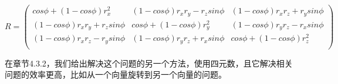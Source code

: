 \documentclass{ctexart}
\begin{document}
\begin{equation}
	\label{RotateArb4}
	R=\left(
		\begin{array}{ccc}
			cos\phi+(1-cos\phi)r_{x}^{2} & (1-cos\phi)r_{x}r_{y}-r_{z}sin\phi & (1-cos\phi)r_{x}r_{z}+r_{y}sin\phi\\
			(1-cos\phi)r_{x}r_{y}+r_{z}sin\phi & cos\phi+(1-cos\phi)r_{y}^2 & (1-cos\phi)r_{y}r_{z}-r_{x}sin\phi\\
			(1-cos\phi)r_{x}r_{z}-r_{y}sin\phi & (1-cos\phi)r_{y}r_{z}+r_{x}sin\phi &
			cos\phi+(1-cos\phi)r_{z}^{2}\\
		\end{array}
	\right)
\end{equation}

在章节4.3.2，我们给出解决这个问题的另一个方法，使用四元数，且它解决相关问题的效率更高，比如从一个向量旋转到另一个向量的问题。
\end{document}
